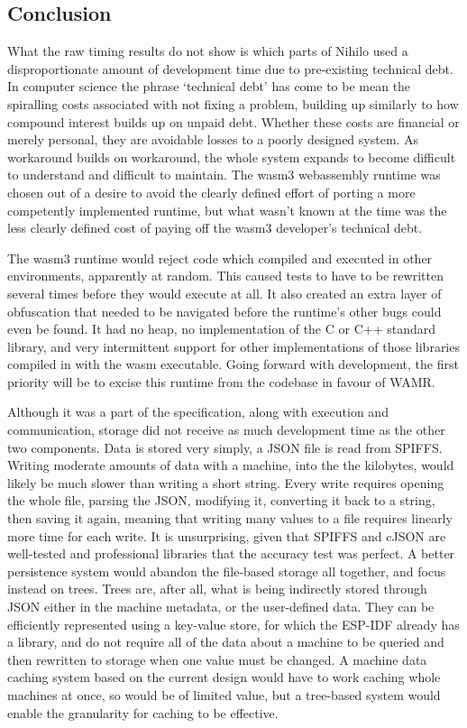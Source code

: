 \documentclass{article}
\begin{document}
\subsection{Conclusion}
What the raw timing results do not show is which parts of Nihilo used a disproportionate amount of development time due to pre-existing technical debt. In computer science the phrase `technical debt' has come to be mean the spiralling costs associated with not fixing a problem, building up similarly to how compound interest builds up on unpaid debt. Whether these costs are financial or merely personal, they are avoidable losses to a poorly designed system. As workaround builds on workaround, the whole system expands to become difficult to understand and difficult to maintain. The wasm3 webassembly runtime was chosen out of a desire to avoid the clearly defined effort of porting a more competently implemented runtime, but what wasn't known at the time was the less clearly defined cost of paying off the wasm3 developer's technical debt. 

The wasm3 runtime would reject code which compiled and executed in other environments, apparently at random. This caused tests to have to be rewritten several times before they would execute at all. It also created an extra layer of obfuscation that needed to be navigated before the runtime's other bugs could even be found. It had no heap, no implementation of the C or C++ standard library, and very intermittent support for other implementations of those libraries compiled in with the wasm executable. Going forward with development, the first priority will be to excise this runtime from the codebase in favour of WAMR.

Although it was a part of the specification, along with execution and communication, storage did not receive as much development time as the other two components. Data is stored very simply, a JSON file is read from SPIFFS. Writing moderate amounts of data with a machine, into the the kilobytes, would likely be much slower than writing a short string. Every write requires opening the whole file, parsing the JSON, modifying it, converting it back to a string, then saving it again, meaning that writing many values to a file requires linearly more time for each write. It is unsurprising, given that SPIFFS and cJSON are well-tested and professional libraries that the accuracy test was perfect. A better persistence system would abandon the file-based storage all together, and focus instead on trees. Trees are, after all, what is being indirectly stored through JSON either in the machine metadata, or the user-defined data. They can be efficiently represented using a key-value store, for which the ESP-IDF already has a library, and do not require all of the data about a machine to be queried and then rewritten to storage when one value must be changed. A machine data caching system based on the current design would have to work caching whole machines at once, so would be of limited value, but a tree-based system would enable the granularity for caching to be effective.
\end{document}
